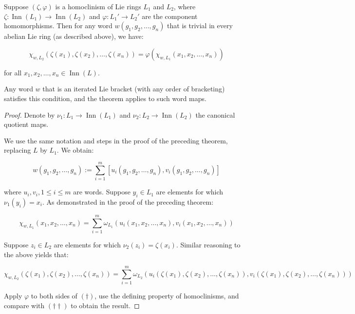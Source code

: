 \documentclass{ucetd}
\begin{document}
\begin{theorem}\label{thm:iterated-bracket-commutes-homoclinisms}
  Suppose $(\zeta,\varphi)$ is a homoclinism of Lie rings $L_1$ and
  $L_2$, where $\zeta:\operatorname{Inn}(L_1) \to
  \operatorname{Inn}(L_2)$ and $\varphi:L_1' \to L_2'$ are the
  component homomorphisms. Then for any word $w(g_1,g_2,\dots,g_n)$
  that is trivial in every abelian Lie ring (as described above), we have:

  $$\chi_{w,L_2}(\zeta(x_1),\zeta(x_2),\dots,\zeta(x_n)) = \varphi(\chi_{w,L_1}(x_1,x_2,\dots,x_n))$$

  for all $x_1,x_2,\dots,x_n \in \operatorname{Inn}(L)$.

  Any word $w$ that is an iterated Lie bracket (with any order of
  bracketing) satisfies this condition, and the theorem applies to
  such word maps.
\end{theorem}

\begin{proof}
  Denote by $\nu_1:L_1 \to \operatorname{Inn}(L_1)$ and $\nu_2:L_2 \to
  \operatorname{Inn}(L_2)$ the canonical quotient maps.

  We use the same notation and steps in the proof of the preceding
  theorem, replacing $L$ by $L_1$. We obtain:

  $$w(g_1,g_2,\dots,g_n) := \sum_{i=1}^m [u_i(g_1,g_2,\dots,g_n),v_i(g_1,g_2,\dots,g_n)]$$

  where $u_i,v_i, 1 \le i \le m$ are words. Suppose $y_i \in L_1$ are
  elements for which $\nu_1(y_i) = x_i$. As demonstrated in the proof of
  the preceding theorem:

  \begin{equation*}
    \chi_{w,L_1}(x_1,x_2,\dots,x_n) = \sum_{i=1}^m \omega_{L_1}(u_i(x_1,x_2,\dots,x_n),v_i(x_1,x_2,\dots,x_n)) \tag{$\dagger$}
  \end{equation*}

  Suppose $z_i \in L_2$ are elements for which $\nu_2(z_i) =
  \zeta(x_i)$. Similar reasoning to the above yields that:

  \begin{equation*}
    \chi_{w,L_2}(\zeta(x_1),\zeta(x_2),\dots,\zeta(x_n)) = \sum_{i=1}^m \omega_{L_2}(u_i(\zeta(x_1),\zeta(x_2),\dots,\zeta(x_n)),v_i(\zeta(x_1),\zeta(x_2),\dots,\zeta(x_n))) \tag{$\dagger\dagger$}
  \end{equation*}

  Apply $\varphi$ to both sides of $(\dagger)$, use the defining
  property of homoclinisms, and compare with $(\dagger\dagger)$ to
  obtain the result.
\end{proof}
\end{document}
